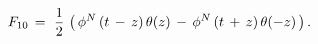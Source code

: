 \begin{equation}
\label{wave}
 F_{10} \, = \, \, {1 \over 2} \, \left (\, \phi^N\, (t\, -\, z) \,
 \theta (z) \, - \, \phi^N\, (t\, + \, z) \, \theta (- z)
 \,\right ).
\end{equation}

